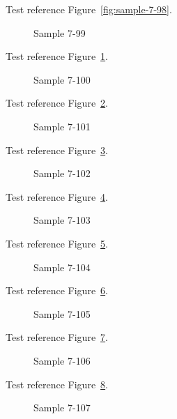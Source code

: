 Test reference Figure~\ref{fig:sample-7-98}.

\begin{figure}[tbhp]
\caption{Sample 7-99}
\label{fig:sample-7-99}
\end{figure}

Test reference Figure~\ref{fig:sample-7-99}.

\begin{figure}[tbhp]
\caption{Sample 7-100}
\label{fig:sample-7-100}
\end{figure}

Test reference Figure~\ref{fig:sample-7-100}.

\begin{figure}[tbhp]
\caption{Sample 7-101}
\label{fig:sample-7-101}
\end{figure}

Test reference Figure~\ref{fig:sample-7-101}.

\begin{figure}[tbhp]
\caption{Sample 7-102}
\label{fig:sample-7-102}
\end{figure}

Test reference Figure~\ref{fig:sample-7-102}.

\begin{figure}[tbhp]
\caption{Sample 7-103}
\label{fig:sample-7-103}
\end{figure}

Test reference Figure~\ref{fig:sample-7-103}.

\begin{figure}[tbhp]
\caption{Sample 7-104}
\label{fig:sample-7-104}
\end{figure}

Test reference Figure~\ref{fig:sample-7-104}.

\begin{figure}[tbhp]
\caption{Sample 7-105}
\label{fig:sample-7-105}
\end{figure}

Test reference Figure~\ref{fig:sample-7-105}.

\begin{figure}[tbhp]
\caption{Sample 7-106}
\label{fig:sample-7-106}
\end{figure}

Test reference Figure~\ref{fig:sample-7-106}.

\begin{figure}[tbhp]
\caption{Sample 7-107}
\label{fig:sample-7-107}
\end{figure}

